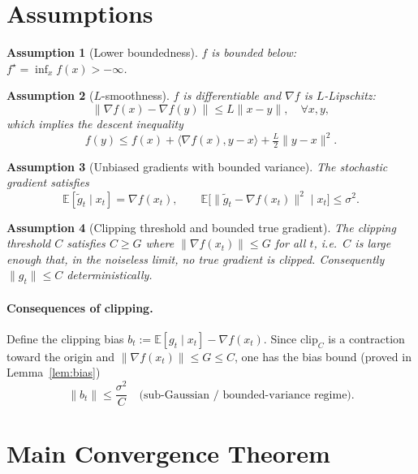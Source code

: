 \documentclass[11pt]{article}
\newtheorem{assumption}{Assumption}
\begin{document}
\section*{Assumptions}

\begin{assumption}[Lower boundedness]\label{as:lb}
$f$ is bounded below: $f^\star = \inf_x f(x) > -\infty$.
\end{assumption}

\begin{assumption}[$L$-smoothness]\label{as:smooth}
$f$ is differentiable and $\nabla f$ is $L$-Lipschitz:
\[
\|\nabla f(x) - \nabla f(y)\| \le L\|x-y\|,\quad \forall x,y,
\]
which implies the descent inequality
\[
f(y) \le f(x) + \langle \nabla f(x), y-x\rangle + \tfrac{L}{2}\|y-x\|^2.
\]
\end{assumption}

\begin{assumption}[Unbiased gradients with bounded variance]\label{as:noise}
The stochastic gradient satisfies
\[
\mathbb{E}[\widetilde g_t\mid x_t] = \nabla f(x_t),\qquad
\mathbb{E}\big[\|\widetilde g_t - \nabla f(x_t)\|^2 \mid x_t\big]\le \sigma^2.
\]
\end{assumption}

\begin{assumption}[Clipping threshold and bounded true gradient]\label{as:clip}
The clipping threshold $C$ satisfies $C \ge G$ where $\|\nabla f(x_t)\|\le G$ for all $t$,
i.e.\ $C$ is large enough that, in the noiseless limit, no true gradient is clipped.
Consequently $\|g_t\|\le C$ deterministically.
\end{assumption}

\paragraph{Consequences of clipping.}
Define the clipping bias $b_t := \mathbb{E}[g_t\mid x_t] - \nabla f(x_t)$. Since
$\mathrm{clip}_C$ is a contraction toward the origin and $\|\nabla f(x_t)\|\le G\le C$,
one has the bias bound (proved in Lemma~\ref{lem:bias})
\[
\|b_t\| \le \frac{\sigma^2}{C}\quad\text{(sub-Gaussian / bounded-variance regime).}
\]

\section*{Main Convergence Theorem}
\end{document}
